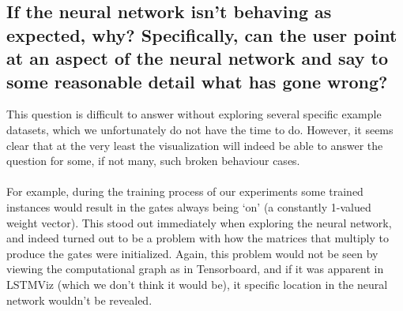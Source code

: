 \documentclass[journal]{vgtc}                %
\begin{document}
\subsection{If the neural network isn't behaving as expected, why?  Specifically, can the user point at an aspect of the neural network and say to some reasonable detail what has gone wrong?}
This question is difficult to answer without exploring several specific example datasets, which we unfortunately do not have the time to do.
However, it seems clear that at the very least the visualization will indeed be able to answer the question for some, if not many, such broken behaviour cases.
\\
\\
For example, during the training process of our experiments some trained instances would result in the gates always being `on' (a constantly 1-valued weight vector).
This stood out immediately when exploring the neural network, and indeed turned out to be a problem with how the matrices that multiply to produce the gates were initialized.
Again, this problem would not be seen by viewing the computational graph as in Tensorboard, and if it was apparent in LSTMViz (which we don't think it would be), it specific location in the neural network wouldn't be revealed.
\end{document}
